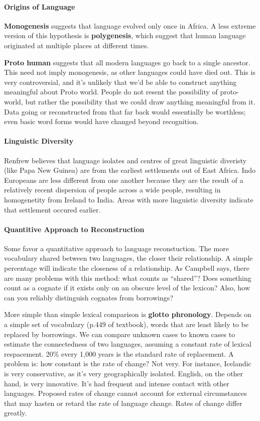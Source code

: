 \documentclass{exam}
\begin{document}
\paragraph{Origins of Language}
\textbf{Monogenesis} suggests that language evolved only once in Africa. 
A less extreme version of this hypothesis is \textbf{polygenesis}, which suggest that human language originated at multiple places at different times.

\textbf{Proto human} suggests that all modern languages go back to a single ancestor. 
This need not imply monogenesis, as other languages could have died out.
This is very controversial, and it's unlikely that we'd be able to construct anything meaningful about Proto world. 
People do not resent the possibility of proto-world, but rather the possibility that we could draw anything meaningful from it. 
Data going or reconstructed from that far back would essentially be worthless; even basic word forms would have changed beyond recognition. 




\paragraph{Linguistic Diversity}Renfrew believes that language isolates and centres of great linguistic diveristy (like Papa New Guinea) are from the earliest settlements out of East Africa. 
Indo Europeans are less different from one another because they are the result of a relatively recent dispersion of people across a wide people, resulting in homogenetity from Ireland to India. 
Areas with more linguistic diversity indicate that settlement occured earlier. 


\paragraph{Quantitive Approach to Reconstruction} Some favor a quantitative approach to language reconstuction.
The more vocabulary shared between two languages, the closer their relationship. 
A simple percentage will indicate the closeness of a relationship. 
As Campbell says, there are many problems with this method: what counts as ``shared''? 
Does something count as a cognate if it exists only on an obscure level of the lexicon?
Also, how can you reliably distinguish cognates from borrowings?

More simple than simple lexical comparison is \textbf{glotto phronology}. 
Depends on a simple set of vocabulary (p.449 of textbook), words that are least likely to be replaced by borrowings. 
We can compare unknown cases to known cases to estimate the connectedness of two languages, assuming a constant rate of lexical respacement. 
20\% every 1,000 years is the standard rate of replacement. 
A problem is: how constant is the rate of change? Not very.
For instance, Icelandic is very conservative, as it's very geographically isolated.
English, on the other hand, is very innovative. 
It's had frequent and intense contact with other languages. 
Proposed rates of change cannot account for external circumstances that may hasten or retard the rate of language change. 
Rates of change differ greatly. 
\end{document}
